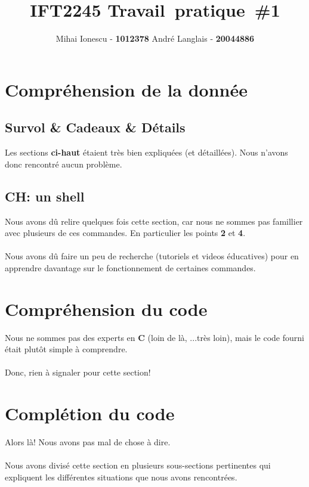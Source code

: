 \documentclass{article}
\title{IFT2245 \mid Travail\ pratique\ \#1 }
\author{Mihai Ionescu - \textbf{1012378} André Langlais - \textbf{20044886}}
\begin{document}
\maketitle


\section{Compréhension de la donnée}

\subsection{Survol \& Cadeaux \& Détails}
Les sections \textbf{ci-haut} étaient très bien expliquées (et détaillées). Nous n'avons donc rencontré aucun problème.

\subsection{CH: un shell}
Nous avons dû relire quelques fois cette section,  car nous ne sommes pas famillier avec plusieurs de ces commandes. En particulier les points \textbf{2} et \textbf{4}.
\\\\
Nous avons dû faire un peu de recherche (tutoriels et videos éducatives) pour en apprendre davantage sur le fonctionnement de certaines commandes.

\section{Compréhension du code}

Nous ne sommes pas des experts en \textbf{C} (loin de là, ...très loin), mais le code fourni était plutôt simple à comprendre.
\\\\
Donc, rien à signaler pour cette section!

\section{Complétion du code}

Alors là! Nous avons pas mal de chose à dire.
\\\\
Nous avons divisé cette section en plusieurs sous-sections pertinentes qui expliquent les différentes situations que nous avons rencontrées.
\end{document}
